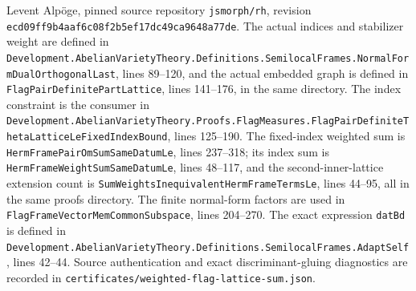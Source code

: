 Levent Alp\"oge, pinned source repository
\texttt{jsmorph/rh}, revision
\texttt{ecd09ff9b4aaf6c08f2b5ef17dc49ca9648a77de}.
The actual indices and stabilizer weight are defined in
\texttt{Development.AbelianVarietyTheory.\allowbreak Definitions.SemilocalFrames.\allowbreak NormalFormDualOrthogonalLast},
lines 89--120, and the actual embedded graph is defined
in \texttt{FlagPairDefinitePartLattice}, lines 141--176,
in the same directory.  The index constraint is the
consumer in
\texttt{Development.AbelianVarietyTheory.\allowbreak Proofs.FlagMeasures.\allowbreak FlagPairDefiniteThetaLatticeLeFixedIndexBound},
lines 125--190.  The fixed-index weighted sum is
\texttt{HermFramePairOmSumSameDatumLe}, lines 237--318;
its index sum is \texttt{HermFrameWeightSumSameDatumLe},
lines 48--117, and the second-inner-lattice extension
count is \texttt{SumWeightsInequivalentHermFrameTermsLe},
lines 44--95, all in the same proofs directory.
The finite normal-form factors are used in
\texttt{FlagFrameVectorMemCommonSubspace}, lines 204--270.
The exact expression \texttt{datBd} is defined in
\texttt{Development.AbelianVarietyTheory.\allowbreak Definitions.SemilocalFrames.\allowbreak AdaptSelf},
lines 42--44.  Source authentication and exact
discriminant-gluing diagnostics are recorded in
\texttt{certificates/weighted-flag-lattice-sum.json}.
